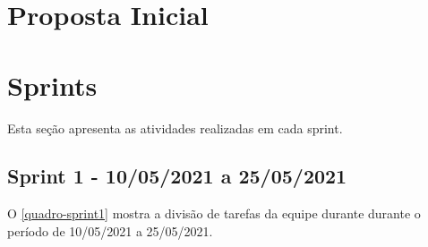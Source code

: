 \documentclass[
    12pt,               %
    openright,          %
    oneside,
    a4paper,            %
    english,            %
    brazil              %
    ]{ifsp-spo-inf-ctds} %
\begin{document}
\begin{apendicesenv}

\partapendices
\chapter{Proposta Inicial}


\chapter{Sprints}
\label{sprints-atividades}

Esta seção apresenta as atividades realizadas em cada \gls{sprint}.


\section{Sprint 1 - 10/05/2021 a 25/05/2021}

O \autoref{quadro-sprint1} mostra a divisão de tarefas da equipe durante durante o período de 10/05/2021 a 25/05/2021.


\end{apendicesenv}
\end{document}
